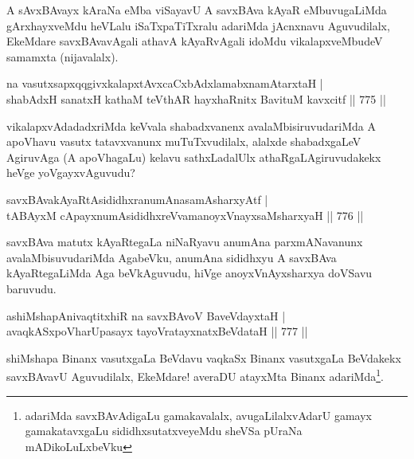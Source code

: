 \begin{artha}
A sAvxBAvayx kAraNa eMba viSayavU A savxBAva kAyaR eMbuvugaLiMda gArxhayxveMdu heVLalu iSaTxpaTiTxralu adariMda jAcnxnavu Aguvudilalx, EkeMdare savxBAvavAgali athavA kAyaRvAgali idoMdu vikalapxveMbudeV samamxta (nijavalalx).
\end{artha}

\begin{shl}
na vasutxsapxqqgivxkalapxtAvxcaCxbAdxlamabxnamAtarxtaH | \\
shabAdxH sanatxH kathaM teV\s thAR hayxhaRnitx BavituM kavxcitf \hfill||  775 ||  
\end{shl}

\begin{artha}
vikalapxvAdadadxriMda keVvala shabadxvanenx avalaMbisiruvudariMda A apoVhavu vasutx tatavxvanunx muTuTxvudilalx, alalxde shabadxgaLeV AgiruvAga (A apoVhagaLu) kelavu sathxLadalUlx athaRgaLAgiruvudakekx heVge yoVgayxvAguvudu?
\end{artha}

\begin{shl}
\footnotemark[2]savxBAvakAyaRtAsididhxranumAnasamAsharxyAtf | \\
tABAyxM cApayxnumAsididhxreVvamanoyxVnayxsaMsharxyaH \hfill||  776 ||  
\end{shl}

\begin{artha}
savxBAva matutx kAyaRtegaLa niNaRyavu anumAna parxmANavanunx avalaMbisuvudariMda AgabeVku, anumAna sididhxyu A savxBAva kAyaRtegaLiMda Aga beVkAguvudu, hiVge anoyxVnAyxsharxya doVSavu baruvudu.
\end{artha}


\begin{shl}
ashiMshapAnivaqtitxhiR na savxBAvoV BaveVdayxtaH | \\
avaqkASxpoVharUpasayx tayoVratayxnatxBeVdataH \hfill||  777 ||  
\end{shl}

\begin{artha}
shiMshapa Binanx vasutxgaLa BeVdavu vaqkaSx Binanx vasutxgaLa BeVdakekx savxBAvavU Aguvudilalx, EkeMdare! averaDU atayxMta Binanx adariMda\footnote{adariMda savxBAvAdigaLu gamakavalalx, avugaLilalxvAdarU gamayx gamakatavxgaLu sididhxsutatxveyeMdu sheVSa pUraNa mADikoLuLxbeVku}.
\end{artha}

